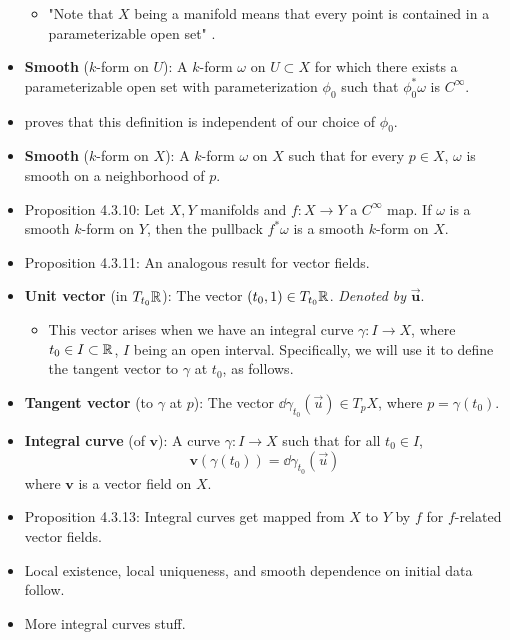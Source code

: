 \documentclass[../notes.tex]{subfiles}
\begin{document}
\begin{itemize}
\begin{itemize}
        \item "Note that $X$ being a manifold means that every point is contained in a parameterizable open set" \parencite[126]{bib:DifferentialForms}.
    \end{itemize}
    \item \textbf{Smooth} ($k$-form on $U$): A $k$-form $\omega$ on $U\subset X$ for which there exists a parameterizable open set with parameterization $\phi_0$ such that $\phi_0^*\omega$ is $C^\infty$.
    \item \textcite{bib:DifferentialForms} proves that this definition is independent of our choice of $\phi_0$.
    \item \textbf{Smooth} ($k$-form on $X$): A $k$-form $\omega$ on $X$ such that for every $p\in X$, $\omega$ is smooth on a neighborhood of $p$.
    \item Proposition 4.3.10: Let $X,Y$ manifolds and $f:X\to Y$ a $C^\infty$ map. If $\omega$ is a smooth $k$-form on $Y$, then the pullback $f^*\omega$ is a smooth $k$-form on $X$.
    \item Proposition 4.3.11: An analogous result for vector fields.
    \item \textbf{Unit vector} (in $T_{t_0}\mathbb{R}$): The vector $(t_0,1)\in T_{t_0}\mathbb{R}$. \emph{Denoted by} $\bm{\vec{u}}$.
    \begin{itemize}
        \item This vector arises when we have an integral curve $\gamma:I\to X$, where $t_0\in I\subset\mathbb{R}$, $I$ being an open interval. Specifically, we will use it to define the tangent vector to $\gamma$ at $t_0$, as follows.
    \end{itemize}
    \item \textbf{Tangent vector} (to $\gamma$ at $p$): The vector $\dd\gamma_{t_0}(\vec{u})\in T_pX$, where $p=\gamma(t_0)$.
    \item \textbf{Integral curve} (of $\bm{v}$): A curve $\gamma:I\to X$ such that for all $t_0\in I$,
    \begin{equation*}
        \bm{v}(\gamma(t_0)) = \dd\gamma_{t_0}(\vec{u})
    \end{equation*}
    where $\bm{v}$ is a vector field on $X$.
    \item Proposition 4.3.13: Integral curves get mapped from $X$ to $Y$ by $f$ for $f$-related vector fields.
    \item Local existence, local uniqueness, and smooth dependence on initial data follow.
    \item More integral curves stuff.

\end{itemize}
\end{document}
